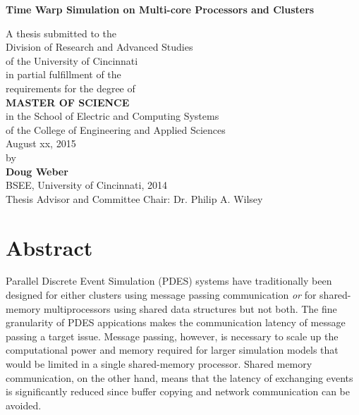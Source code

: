 \documentclass[11pt]{book}
\begin{document}
\thispagestyle{empty}

\doublespacing

\vspace*{0.5in}

\begin{center}
\LARGE{\textbf{Time Warp Simulation on Multi-core Processors and Clusters}}

\vspace*{0.4in}

  {\large A thesis submitted to the\\[0.20in]
    Division of Research and Advanced Studies\\
    of the University of Cincinnati\\[0.20in]
    in partial fulfillment of the\\
    requirements for the degree of\\[0.20in]
    \textbf{MASTER OF SCIENCE}\\[0.20in]
    in the School of Electric and Computing Systems\\
    of the College of Engineering and Applied Sciences\\[0.20in]
    August xx, 2015\\[0.20in]
    by\\[0.20in]
    \textbf{Doug Weber}\\
    BSEE, University of Cincinnati, 2014\\}
  \vspace{0.5in}
  {\large Thesis Advisor and Committee Chair:  Dr. Philip A. Wilsey}
\end{center}

\clearpage

\setcounter{page}{1}
\clearpage

\chapter*{Abstract}

Parallel Discrete Event Simulation (PDES) systems have traditionally been designed for either
clusters using message passing communication \emph{or} for shared-memory multiprocessors using
shared data structures but not both. The fine granularity of PDES appications makes the communication
latency of message passing a target issue. Message passing, however, is necessary to scale up
the computational power and memory required for larger simulation models that would be limited
in a single shared-memory processor. Shared memory communication, on the other hand, means that
the latency of exchanging events is significantly reduced since buffer copying and network
communication can be avoided.
\end{document}
